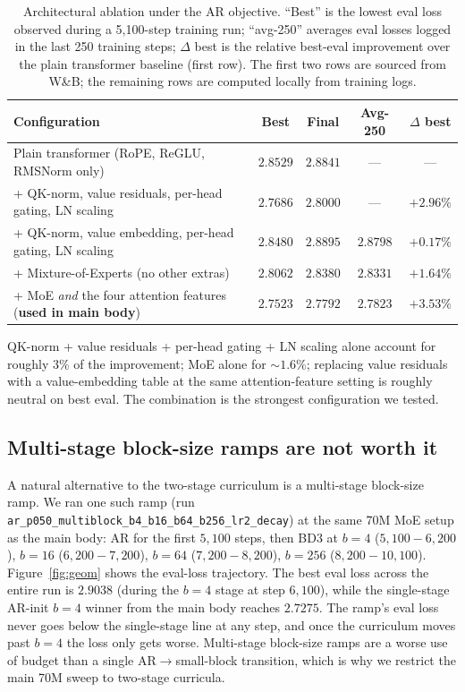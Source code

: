 \documentclass{article}
\begin{document}
\begin{table}[h]
\centering
\caption{Architectural ablation under the AR objective. ``Best'' is the lowest eval loss observed during a 5{,}100-step training run; ``avg-250'' averages eval losses logged in the last 250 training steps; $\Delta$ best is the relative best-eval improvement over the plain transformer baseline (first row). The first two rows are sourced from W\&B; the remaining rows are computed locally from training logs.}
\label{tab:arch_delta}
\small
\begin{tabular}{lcccc}
\toprule
Configuration & Best & Final & Avg-250 & $\Delta$ best \\
\midrule
Plain transformer (RoPE, ReGLU, RMSNorm only)             & $2.8529$ & $2.8841$ & ---      & --- \\
\;+ QK-norm, value residuals, per-head gating, LN scaling & $2.7686$ & $2.8000$ & ---      & $+2.96\%$ \\
\;+ QK-norm, value embedding, per-head gating, LN scaling & $2.8480$ & $2.8895$ & $2.8798$ & $+0.17\%$ \\
\;+ Mixture-of-Experts (no other extras)                  & $2.8062$ & $2.8380$ & $2.8331$ & $+1.64\%$ \\
\;+ MoE \emph{and} the four attention features (\textbf{used in main body})
                                                          & $2.7523$ & $2.7792$ & $2.7823$ & $+3.53\%$ \\
\bottomrule
\end{tabular}
\end{table}

QK-norm + value residuals + per-head gating + LN scaling alone account for roughly $3\%$ of the improvement; MoE alone for ${\sim}1.6\%$; replacing value residuals with a value-embedding table at the same attention-feature setting is roughly neutral on best eval. The combination is the strongest configuration we tested.

\subsection{Multi-stage block-size ramps are not worth it}

A natural alternative to the two-stage curriculum is a multi-stage block-size ramp. We ran one such ramp (run \texttt{ar\_p050\_multiblock\_b4\_b16\_b64\_b256\_lr2\_decay}) at the same 70M MoE setup as the main body: AR for the first $5{,}100$ steps, then BD3 at $b{=}4$ ($5{,}100{-}6{,}200$), $b{=}16$ ($6{,}200{-}7{,}200$), $b{=}64$ ($7{,}200{-}8{,}200$), $b{=}256$ ($8{,}200{-}10{,}100$). Figure~\ref{fig:geom} shows the eval-loss trajectory. The best eval loss across the entire run is $2.9038$ (during the $b{=}4$ stage at step $6{,}100$), while the single-stage AR-init $b{=}4$ winner from the main body reaches $2.7275$. The ramp's eval loss never goes below the single-stage line at any step, and once the curriculum moves past $b{=}4$ the loss only gets worse. Multi-stage block-size ramps are a worse use of budget than a single AR$\to$small-block transition, which is why we restrict the main 70M sweep to two-stage curricula.
\end{document}
